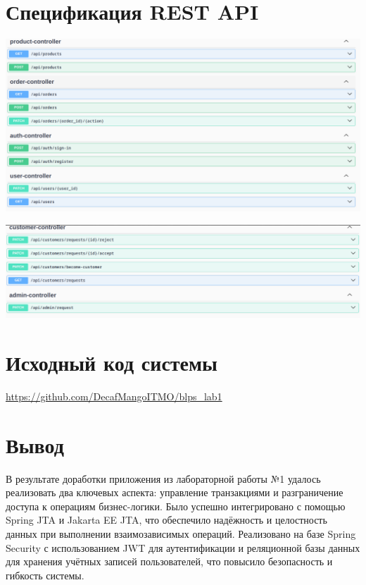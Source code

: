 \documentclass{article}
\begin{document}
\section*{Спецификация REST API}
\begin{center}
    \includegraphics[width=.9\textwidth]{1}
\end{center}
\begin{center}
    \includegraphics[width=.9\textwidth]{2}
\end{center}
\section*{Исходный код системы}
\url{https://github.com/DecafMangoITMO/blps_lab1}

\section*{Вывод}
В результате доработки приложения из лабораторной работы №1 удалось реализовать два ключевых аспекта: управление транзакциями и разграничение доступа к операциям бизнес-логики.
Было успешно интегрировано с помощью Spring JTA и Jakarta EE JTA, что обеспечило надёжность и целостность данных при выполнении взаимозависимых операций.
Реализовано на базе Spring Security с использованием JWT для аутентификации и реляционной базы данных для хранения учётных записей пользователей, что повысило безопасность и гибкость системы.
\end{document}
